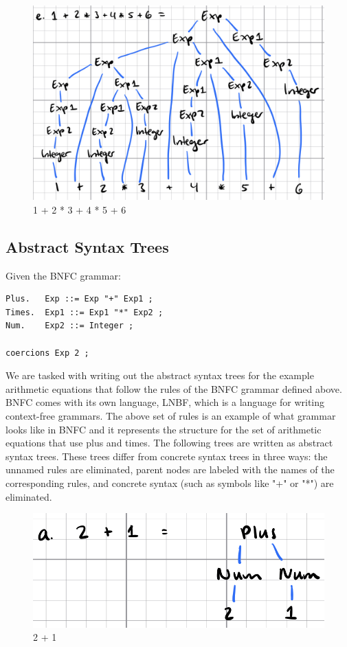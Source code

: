 \documentclass{article}
\theoremstyle{theorem}
\theoremstyle{definition}
\theoremstyle{remark}
\begin{document}
\begin{figure}[H]
\begin{center}
\includegraphics[scale=0.4]{img/C5.png}
\end{center}
\caption{1 + 2 * 3 + 4 * 5 + 6}\label{C5}
\end{figure}

\subsection{Abstract Syntax Trees}

Given the BNFC grammar: 

\begin{lstlisting}
Plus.   Exp ::= Exp "+" Exp1 ;
Times.  Exp1 ::= Exp1 "*" Exp2 ;
Num.    Exp2 ::= Integer ;
	
coercions Exp 2 ;
\end{lstlisting}

We are tasked with writing out the abstract syntax trees for the example arithmetic equations that follow the rules of the BNFC grammar defined above. BNFC comes with its own language, LNBF, which is a language for writing context-free grammars. The above set of rules is an example of what grammar looks like in BNFC and it represents the structure for the set of arithmetic equations that use plus and times. The following trees are written as abstract syntax trees. These trees differ from concrete syntax trees in three ways: the unnamed rules are eliminated, parent nodes are labeled with the names of the corresponding rules, and concrete syntax (such as symbols like "+" or "*") are eliminated. 

\begin{figure}[H]
\begin{center}
\includegraphics[scale=0.4]{img/A1.png}
\end{center}
\caption{2 + 1}\label{A1}
\end{figure}
\end{document}
